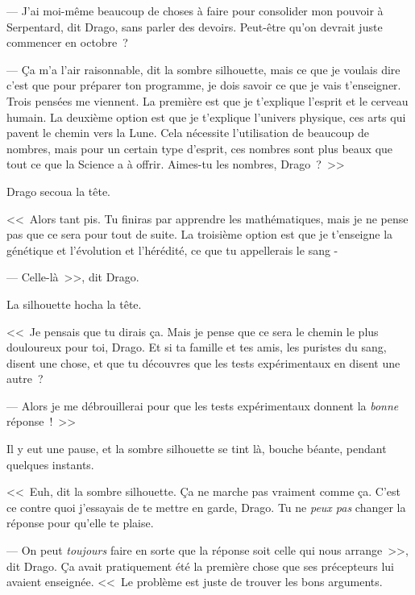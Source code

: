 --- J'ai moi-même beaucoup de choses à faire pour consolider mon pouvoir à Serpentard, dit Drago, sans parler des devoirs. Peut-être qu'on devrait juste commencer en octobre~?

--- Ça m'a l'air raisonnable, dit la sombre silhouette, mais ce que je voulais dire c'est que pour préparer ton programme, je dois savoir ce que je vais t'enseigner. Trois pensées me viennent. La première est que je t'explique l'esprit et le cerveau humain. La deuxième option est que je t'explique l'univers physique, ces arts qui pavent le chemin vers la Lune. Cela nécessite l'utilisation de beaucoup de nombres, mais pour un certain type d'esprit, ces nombres sont plus beaux que tout ce que la Science a à offrir. Aimes-tu les nombres, Drago~?~>>

Drago secoua la tête.

<<~Alors tant pis. Tu finiras par apprendre les mathématiques, mais je ne pense pas que ce sera pour tout de suite. La troisième option est que je t'enseigne la génétique et l'évolution et l'hérédité, ce que tu appellerais le sang -

--- Celle-là~>>, dit Drago.

La silhouette hocha la tête.

<<~Je pensais que tu dirais ça. Mais je pense que ce sera le chemin le plus douloureux pour toi, Drago. Et si ta famille et tes amis, les puristes du sang, disent une chose, et que tu découvres que les tests expérimentaux en disent une autre~?

--- Alors je me débrouillerai pour que les tests expérimentaux donnent la \emph{bonne} réponse~!~>>

Il y eut une pause, et la sombre silhouette se tint là, bouche béante, pendant quelques instants.

<<~Euh, dit la sombre silhouette. Ça ne marche pas vraiment comme ça. C'est ce contre quoi j'essayais de te mettre en garde, Drago. Tu ne \emph{peux pas} changer la réponse pour qu'elle te plaise.

--- On peut \emph{toujours} faire en sorte que la réponse soit celle qui nous arrange~>>, dit Drago. Ça avait pratiquement été la première chose que ses précepteurs lui avaient enseignée. <<~Le problème est juste de trouver les bons arguments.

